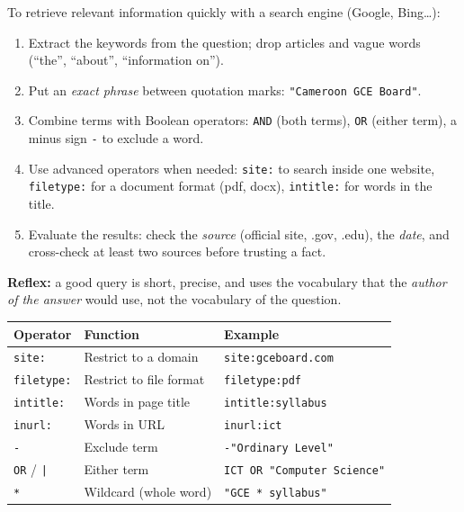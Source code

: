 \documentclass[11pt]{article}
\newcommand{\cle}[1]{{\popxbold\color{popdark}#1}}
\begin{document}
\begin{methode}
To retrieve relevant information quickly with a search engine (Google, Bing\ldots):
\begin{enumerate}
\item Extract the \cle{keywords} from the question; drop articles and vague words (``the'', ``about'', ``information on'').
\item Put an \emph{exact phrase} between \cle{quotation marks}: \texttt{"Cameroon GCE Board"}.
\item Combine terms with \cle{Boolean operators}: \texttt{AND} (both terms), \texttt{OR} (either term), a minus sign \texttt{-} to exclude a word.
\item Use \cle{advanced operators} when needed: \texttt{site:} to search inside one website, \texttt{filetype:} for a document format (pdf, docx), \texttt{intitle:} for words in the title.
\item Evaluate the results: check the \emph{source} (official site, .gov, .edu), the \emph{date}, and cross-check at least two sources before trusting a fact.
\end{enumerate}
\textbf{Reflex:} a good query is short, precise, and uses the vocabulary that the \emph{author of the answer} would use, not the vocabulary of the question.
\end{methode}

\begin{exemplebox}
\begin{center}
\begin{tabularx}{\linewidth}{|l|X|l|}\hline
\rowcolor{popblueL}
\textbf{Operator} & \textbf{Function} & \textbf{Example} \\ \hline
\texttt{site:} & Restrict to a domain & \texttt{site:gceboard.com} \\ \hline
\texttt{filetype:} & Restrict to file format & \texttt{filetype:pdf} \\ \hline
\texttt{intitle:} & Words in page title & \texttt{intitle:syllabus} \\ \hline
\texttt{inurl:} & Words in URL & \texttt{inurl:ict} \\ \hline
\texttt{-} & Exclude term & \texttt{-"Ordinary Level"} \\ \hline
\texttt{OR} / \texttt{|} & Either term & \texttt{ICT OR "Computer Science"} \\ \hline
\texttt{*} & Wildcard (whole word) & \texttt{"GCE * syllabus"} \\ \hline
\end{tabularx}
\end{center}
\end{exemplebox}
\end{document}
